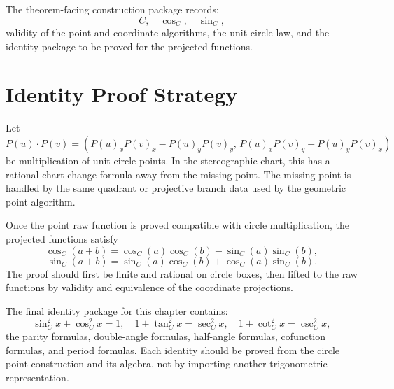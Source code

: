 \begin{definition}
\label{def:geometric-trig-functionraw-construction}
\leanok
The theorem-facing construction package records:
\[
  C,\quad \cos_C,\quad \sin_C,
\]
validity of the point and coordinate algorithms, the unit-circle law, and the
identity package to be proved for the projected functions.
\end{definition}

\section{Identity Proof Strategy}

\begin{theorem}
\label{thm:rational-circle-group-law}
Let
\[
  P(u)\cdot P(v)
  =
  (P(u)_xP(v)_x-P(u)_yP(v)_y,\,
   P(u)_xP(v)_y+P(u)_yP(v)_x)
\]
be multiplication of unit-circle points.  In the stereographic chart, this
has a rational chart-change formula away from the missing point.  The missing
point is handled by the same quadrant or projective branch data used by the
geometric point algorithm.
\end{theorem}

\begin{theorem}
\label{thm:geometric-addition-formulas}
Once the point raw function is proved compatible with circle multiplication,
the projected functions satisfy
\[
  \cos_C(a+b)=\cos_C(a)\cos_C(b)-\sin_C(a)\sin_C(b),
\]
\[
  \sin_C(a+b)=\sin_C(a)\cos_C(b)+\cos_C(a)\sin_C(b).
\]
The proof should first be finite and rational on circle boxes, then lifted to
the raw functions by validity and equivalence of the coordinate projections.
\end{theorem}

\begin{theorem}
\label{thm:geometric-trig-identities}
The final identity package for this chapter contains:
\[
  \sin_C^2 x+\cos_C^2 x=1,\quad
  1+\tan_C^2 x=\sec_C^2 x,\quad
  1+\cot_C^2 x=\csc_C^2 x,
\]
the parity formulas, double-angle formulas, half-angle formulas, cofunction
formulas, and period formulas.  Each identity should be proved from the
circle point construction and its algebra, not by importing another
trigonometric representation.
\end{theorem}

